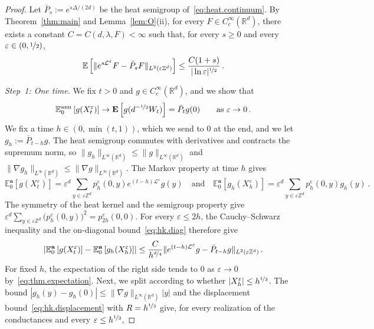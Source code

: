 \documentclass[11pt]{amsart}
\numberwithin{equation}{section}
\newcommand{\Z}{\mathbb{Z}}
\newcommand{\R}{\mathbb{R}}
\newcommand{\E}{\mathbb{E}}
\newcommand{\ba}{\mathbf{a}}
\newcommand{\eps}{\varepsilon}
\newcommand{\Leps}{\mathcal{L}^\varepsilon}
\newcommand{\nf}{\nicefrac}
\begin{document}
\begin{proof}
Let $\bar P_s := e^{s \Delta / (2d)}$ be the heat semigroup of~\eqref{eq:heat.continuum}.
By Theorem~\ref{thm:main} and Lemma~\ref{lem:O}(ii), for every $F \in C^\infty_c(\R^d)$, there exists a constant $C = C(d, \lambda, F) < \infty$ such that, for every $s \geq 0$ and every $\eps \in (0, \nf12)$,
\begin{equation} \label{eq:thm.expectation}
    \E \left[ \| e^{s \Leps} F - \bar P_s F \|_{L^2(\eps \Z^d)} \right] \leq \frac{C (1 + s)}{|\ln \eps|^{\nf12}}\,.
\end{equation}

\smallskip

\emph{Step~1: One time.}
We fix $t > 0$ and $g \in C^\infty_c(\R^d)$, and we show that
\begin{equation} \label{eq:fdd.k1}
    \E^{\mathrm{ann}}_0 \left[ g(X^\eps_t) \right] \to \mathbf{E} \left[ g(d^{-\nf12} W_t) \right] = \bar P_t g(0) \qquad \text{as } \eps \to 0\,.
\end{equation}
We fix a time $h \in (0, \min(t,1))$, which we send to $0$ at the end, and we let $g_h := \bar P_{t - h} g$.
The heat semigroup commutes with derivatives and contracts the supremum norm, so $\|g_h\|_{L^\infty(\R^d)} \leq \|g\|_{L^\infty(\R^d)}$ and $\|\nabla g_h\|_{L^\infty(\R^d)} \leq \|\nabla g\|_{L^\infty(\R^d)}$.
The Markov property at time $h$ gives
\begin{equation*}
    \E^\ba_0 \left[ g(X^\eps_t) \right] = \eps^d \sum_{y \in \eps \Z^d} p^\eps_h(0, y) e^{(t - h) \Leps} g (y)
    \quad \text{and} \quad
    \E^\ba_0 \left[ g_h(X^\eps_h) \right] = \eps^d \sum_{y \in \eps \Z^d} p^\eps_h(0, y) g_h(y)\,.
\end{equation*}
The symmetry of the heat kernel and the semigroup property give $\eps^d \sum_{y \in \eps \Z^d} \bigl( p^\eps_h(0, y) \bigr)^2 = p^\eps_{2h}(0, 0)$.
For every $\eps \leq 2h$, the Cauchy--Schwarz inequality and the on-diagonal bound~\eqref{eq:hk.diag} therefore give
\begin{equation*}
    \left| \E^\ba_0 \left[ g(X^\eps_t) \right] - \E^\ba_0 \left[ g_h(X^\eps_h) \right] \right| \leq \frac{C}{h^{\nf{d}{4}}} \| e^{(t - h) \Leps} g - \bar P_{t - h} g \|_{L^2(\eps \Z^d)}\,.
\end{equation*}
For fixed $h$, the expectation of the right side tends to $0$ as $\eps \to 0$ by~\eqref{eq:thm.expectation}.
Next, we split according to whether $|X^\eps_h| \leq h^{\nf13}$.
The bound $|g_h(y) - g_h(0)| \leq \|\nabla g\|_{L^\infty(\R^d)} |y|$ and the displacement bound~\eqref{eq:hk.displacement} with $R = h^{\nf13}$ give, for every realization of the conductances and every $\eps \leq h^{\nf13}$,

\end{proof}
\end{document}
